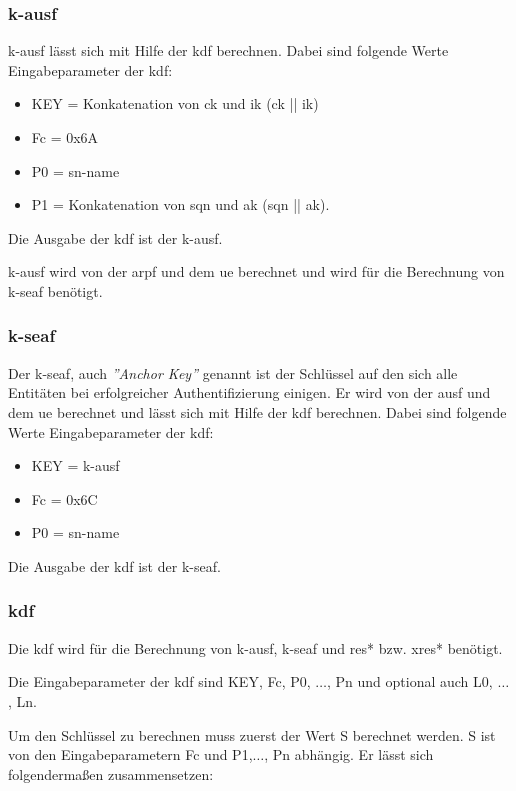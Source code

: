\subsubsection{\gls{k-ausf}}
\gls{k-ausf} l\"asst sich mit Hilfe der \gls{kdf} berechnen.
Dabei sind folgende Werte Eingabeparameter der \gls{kdf}: %
\begin{itemize}
\item KEY = Konkatenation von \gls{ck} und \gls{ik} (\gls{ck} || \gls{ik})
\item Fc = 0x6A
\item P0 = \gls{sn-name}
\item P1 = Konkatenation von \gls{sqn} und \gls{ak} (\gls{sqn} || \gls{ak}).
\end{itemize}
Die Ausgabe der \gls{kdf} ist der \gls{k-ausf}.

\gls{k-ausf} wird von der \gls{arpf} und dem \gls{ue} berechnet und wird f\"ur die Berechnung von \gls{k-seaf} ben\"otigt.

\subsubsection{\gls{k-seaf}}
Der \gls{k-seaf}, auch \textit{''Anchor Key''} genannt ist der Schl\"ussel auf den sich alle Entit\"aten bei erfolgreicher Authentifizierung einigen. %
Er wird von der \gls{ausf} und dem \gls{ue} berechnet und l\"asst sich mit Hilfe der \gls{kdf} berechnen.
Dabei sind folgende Werte Eingabeparameter der \gls{kdf}: %
\begin{itemize}
\item KEY = \gls{k-ausf}
\item Fc = 0x6C
\item P0 = \gls{sn-name}
\end{itemize}
Die Ausgabe der \gls{kdf} ist der \gls{k-seaf}.

\subsubsection{\gls{kdf}}
Die \gls{kdf} wird f\"ur die Berechnung von \gls{k-ausf}, \gls{k-seaf} und \gls{res*} bzw. \gls{xres*} ben\"otigt.

Die Eingabeparameter der \gls{kdf} sind KEY, Fc, P0, $ \dots $, Pn und optional auch L0, $ \dots $, Ln.

Um den Schl\"ussel zu berechnen muss zuerst der Wert S berechnet werden. %
S ist von den Eingabeparametern Fc und P1,$ \dots $, Pn abh\"angig.
Er l\"asst sich folgenderma{\ss}en zusammensetzen: 

